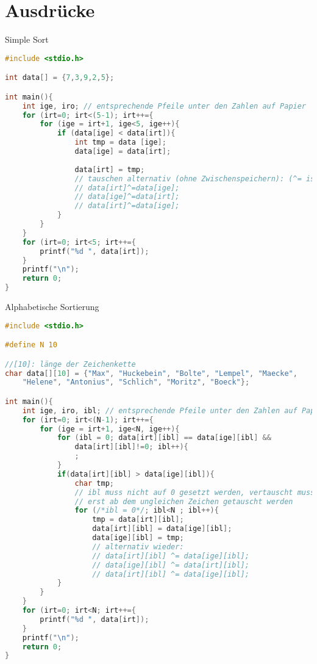 \section{Ausdrücke}

Simple Sort

\begin{lstlisting}[language=C]
#include <stdio.h>

int data[] = {7,3,9,2,5};

int main(){
	int ige, iro; // entsprechende Pfeile unter den Zahlen auf Papier
	for (irt=0; irt<(5-1); irt++={
		for (ige = irt+1, ige<5, ige++){
			if (data[ige] < data[irt]){
				int tmp = data [ige];
				data[ige] = data[irt];
				
				data[irt] = tmp;
				// tauschen alternativ (ohne Zwischenspeichern): (^= ist XOR)
				// data[irt]^=data[ige];
				// data[ige]^=data[irt];
				// data[irt]^=data[ige];
			}
		}	
	}
	for (irt=0; irt<5; irt++={
		printf("%d ", data[irt]);
	}
	printf("\n");
	return 0;
}
\end{lstlisting}

Alphabetische Sortierung

\begin{lstlisting}[language=C]
#include <stdio.h>

#define N 10

//[10]: länge der Zeichenkette
char data[][10] = {"Max", "Huckebein", "Bolte", "Lempel", "Maecke", 
	"Helene", "Antonius", "Schlich", "Moritz", "Boeck"};

int main(){
	int ige, iro, ibl; // entsprechende Pfeile unter den Zahlen auf Papier
	for (irt=0; irt<(N-1); irt++={
		for (ige = irt+1, ige<N, ige++){
			for (ibl = 0; data[irt][ibl] == data[ige][ibl] && 
				data[irt][ibl]!=0; ibl++){
				;
			}
			if(data[irt][ibl] > data[ige][ibl]){
				char tmp;
				// ibl muss nicht auf 0 gesetzt werden, vertauscht muss sowieso
				// erst ab dem ungleichen Zeichen getauscht werden
				for (/*ibl = 0*/; ibl<N ; ibl++){
					tmp = data[irt][ibl];
					data[irt][ibl] = data[ige][ibl];
					data[ige][ibl] = tmp;
					// alternativ wieder:
					// data[irt][ibl] ^= data[ige][ibl];
					// data[ige][ibl] ^= data[irt][ibl];
					// data[irt][ibl] ^= data[ige][ibl];
			}
		}	
	}
	for (irt=0; irt<N; irt++={
		printf("%d ", data[irt]);
	}
	printf("\n");
	return 0;
}
\end{lstlisting}

\newpage
